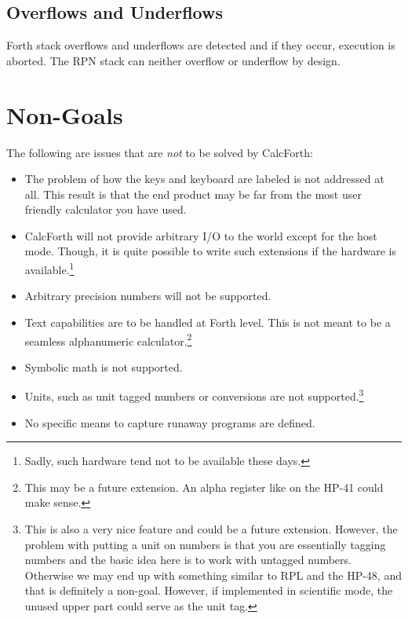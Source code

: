 \documentclass[a4paper]{article}
\begin{document}
\subsection{Overflows and Underflows}
Forth stack overflows and underflows are detected and if they occur, execution is aborted.  The RPN stack can neither overflow or underflow by design.

\section{Non-Goals}
The following are issues that are {\it not\/} to be solved by CalcForth:
\begin{itemize}
\item The problem of how the keys and keyboard are labeled is not addressed at all. This result is that the end product may be far from the most user friendly calculator you have used.
\item CalcForth will not provide arbitrary I/O to the world except for the host mode. Though, it is quite possible to write such extensions if the hardware is available.\footnote{Sadly, such hardware tend not to be available these days.}
\item Arbitrary precision numbers will not be supported.
\item Text capabilities are to be handled at Forth level. This is not meant to be a seamless alphanumeric calculator.\footnote{This may be a future extension. An alpha register like on the HP-41 could make sense.}
\item Symbolic math is not supported.
\item Units, such as unit tagged numbers or conversions are not supported.\footnote{This is also a very nice feature and could be a future extension. However, the problem with putting a unit on numbers is that you are essentially tagging numbers and the basic idea here is to work with untagged numbers. Otherwise we may end up with something similar to RPL and the HP-48, and that is definitely a non-goal. However, if implemented in scientific mode, the unused upper part could serve as the unit tag.}
\item No specific means to capture runaway programs are defined.
\end{itemize}
\end{document}
